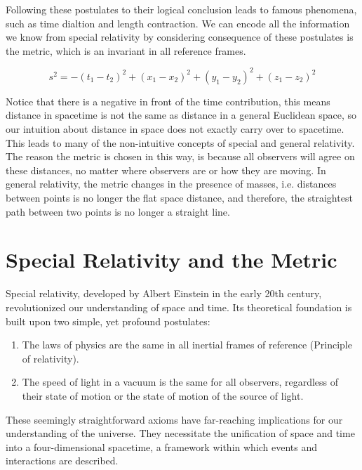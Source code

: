 Following these postulates to their logical conclusion leads to famous phenomena, such as time dialtion and length contraction. We can encode all the information we know from special relativity by considering consequence of these postulates is the metric, which is an invariant in all reference frames.

\begin{equation}\label{eq:Flat spacetime metric}
    s^2 = - (t_1-t_2)^2 + (x_1-x_2)^2 + (y_1-y_2)^2 + (z_1-z_2)^2
\end{equation}

Notice that there is a negative in front of the time contribution, this means distance in spacetime is not the same as distance in a general Euclidean space, so our intuition about distance in space does not exactly carry over to spacetime. This leads to many of the non-intuitive concepts of special and general relativity. The reason the metric is chosen in this way, is because all observers will agree on these distances, no matter where observers are or how they are moving. In general relativity, the metric changes in the presence of masses, i.e. distances between points is no longer the flat space distance, and therefore, the straightest path between two points is no longer a straight line.

\section{Special Relativity and the Metric}

Special relativity, developed by Albert Einstein in the early 20th century, revolutionized our understanding of space and time. Its theoretical foundation is built upon two simple, yet profound postulates: 

\begin{enumerate}
    \item The laws of physics are the same in all inertial frames of reference (Principle of relativity).
    \item The speed of light in a vacuum is the same for all observers, regardless of their state of motion or the state of motion of the source of light.
\end{enumerate}

These seemingly straightforward axioms have far-reaching implications for our understanding of the universe. They necessitate the unification of space and time into a four-dimensional spacetime, a framework within which events and interactions are described. 

